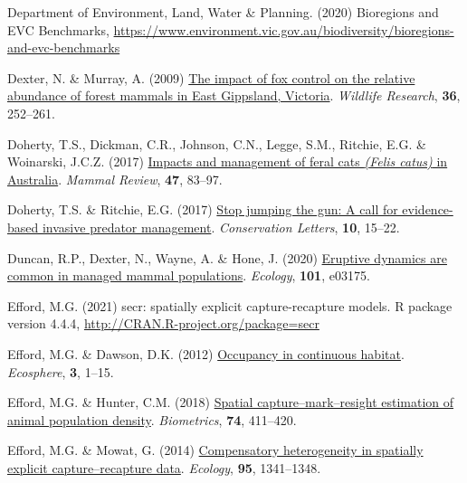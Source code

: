\documentclass[preprint, 3p, authoryear]{elsarticle} %
\newlength{\cslhangindent}
\newlength{\cslentryspacingunit} %
\newenvironment{CSLReferences}[2] %
 {%
  \setlength{\parindent}{0pt}
  \ifodd #1
  \let\oldpar\par
  \def\par{\hangindent=\cslhangindent\oldpar}
  \fi
  \setlength{\parskip}{#2\cslentryspacingunit}
 }%
 {}
\begin{document}
\begin{CSLReferences}{1}{0}
\leavevmode{}%
Department of Environment, Land, Water \& Planning. (2020) {Bioregions and EVC Benchmarks}, \url{https://www.environment.vic.gov.au/biodiversity/bioregions-and-evc-benchmarks}

\leavevmode{}%
Dexter, N. \& Murray, A. (2009) \href{https://doi.org/10.1071/WR08135}{The impact of fox control on the relative abundance of forest mammals in {East Gippsland, Victoria}}. \emph{Wildlife Research}, \textbf{36}, 252--261.

\leavevmode{}%
Doherty, T.S., Dickman, C.R., Johnson, C.N., Legge, S.M., Ritchie, E.G. \& Woinarski, J.C.Z. (2017) \href{https://doi.org/10.1111/mam.12080}{Impacts and management of feral cats \emph{({Felis catus})} in {{A}ustralia}}. \emph{Mammal Review}, \textbf{47}, 83--97.

\leavevmode{}%
Doherty, T.S. \& Ritchie, E.G. (2017) \href{https://doi.org/10.1111/conl.12251}{Stop jumping the gun: A call for evidence-based invasive predator management}. \emph{Conservation Letters}, \textbf{10}, 15--22.

\leavevmode{}%
Duncan, R.P., Dexter, N., Wayne, A. \& Hone, J. (2020) \href{https://doi.org/10.1002/ecy.3175}{Eruptive dynamics are common in managed mammal populations}. \emph{Ecology}, \textbf{101}, e03175.

\leavevmode{}%
Efford, M.G. (2021) {secr: spatially explicit capture-recapture models. R package version 4.4.4}, \url{http://CRAN.R-project.org/package=secr}

\leavevmode{}%
Efford, M.G. \& Dawson, D.K. (2012) \href{https://doi.org/10.1890/ES11-00308.1}{Occupancy in continuous habitat}. \emph{Ecosphere}, \textbf{3}, 1--15.

\leavevmode{}%
Efford, M.G. \& Hunter, C.M. (2018) \href{https://doi.org/10.1111/biom.12766}{Spatial capture--mark--resight estimation of animal population density}. \emph{Biometrics}, \textbf{74}, 411--420.

\leavevmode{}%
Efford, M.G. \& Mowat, G. (2014) \href{https://doi.org/10.1890/13-1497.1}{Compensatory heterogeneity in spatially explicit capture--recapture data}. \emph{Ecology}, \textbf{95}, 1341--1348.


\end{CSLReferences}
\end{document}

